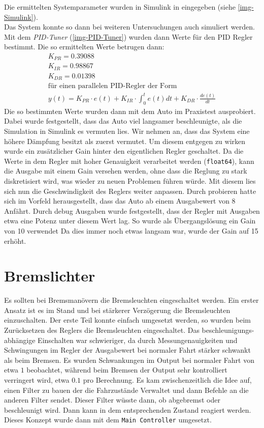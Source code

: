 \documentclass[a4paper,12pt]{report}
\begin{document}
	Die ermittelten Systemparameter wurden in Simulink in eingegeben (siehe \autoref{img-Simulink}). \\
	Das System konnte so dann bei weiteren Untersuchungen auch simuliert werden. \\
	Mit dem \emph{PID-Tuner} (\autoref{img-PID-Tuner}) wurden dann Werte für den PID Regler bestimmt.
	Die so ermittelten Werte betrugen dann: \\
	\begin{gather*}
		K_{PR} = 0.39088 \\
		K_{IR} = 0.98867 \\
		K_{DR} = 0.01398 \\
		\text{für einen parallelen PID-Regler der Form}\\
		y(t) = K_{PR} \cdot e(t) + K_{IR} \cdot \int_{0}^{t} e(t)dt + K_{DR} \cdot \frac{de(t)}{dt}
	\end{gather*}
	Die so bestimmten Werte wurden dann mit dem Auto im Praxistest ausprobiert.
	Dabei wurde festgestellt, dass das Auto viel langsamer beschleunigte, als die Simulation in Simulink es vermuten lies.
	Wir nehmen an, dass das System eine höhere Dämpfung besitzt als zuerst vermutet.
	Um diesem entgegen zu wirken wurde ein zusätzlicher Gain hinter den eigentlichen Regler geschaltet.
	Da die Werte in dem Regler mit hoher Genauigkeit verarbeitet werden (\texttt{float64}), kann die Ausgabe mit einem Gain versehen werden, ohne dass die Reglung zu stark diskretisiert wird, was wieder zu neuen Problemen führen würde.
	Mit diesem lies sich nun die Geschwindigkeit des Reglers weiter anpassen.
	Durch probieren hatte sich im Vorfeld herausgestellt, dass das Auto ab einem Ausgabewert von 8 Anfährt.
	Durch debug Ausgaben wurde festgestellt, dass der Regler mit Ausgaben etwa eine Potenz unter diesem Wert lag.
	So wurde als Übergangslösung ein Gain von 10 verwendet
	 Da dies immer noch etwas langsam war, wurde der Gain auf 15 erhöht. \\

\section{Bremslichter}
	Es sollten bei Bremsmanövern die Bremsleuchten eingeschaltet werden.
	Ein erster Ansatz ist es im Stand und bei stärkerer Verzögerung die Bremsleuchten einzuschalten.
	Der erste Teil konnte einfach umgesetzt werden, so wurden beim Zurücksetzen des Reglers die Bremsleuchten eingeschaltet.
	Das beschleunigungs-abhängige Einschalten war schwieriger, da durch Messungenauigkeiten und Schwingungen im Regler der Ausgabewert bei normaler Fahrt stärker schwankt als beim Bremsen.
	Es wurden Schwankungen im Output bei normaler Fahrt von etwa $1$ beobachtet, während beim Bremsen der Output sehr kontrolliert verringert wird, etwa $0.1$ pro Berechnung.
	Es kam zwischenzeitlich die Idee auf, einen Filter zu bauen der die Fahrzustände Verwaltet und dann Befehle an die anderen Filter sendet. 
	Dieser Filter wüsste dann, ob abgebremst oder beschleunigt wird. 
	Dann kann in dem entsprechenden Zustand reagiert werden. 
	Dieses Konzept wurde dann mit dem \texttt{Main Controller} umgesetzt.
	
\end{document}
